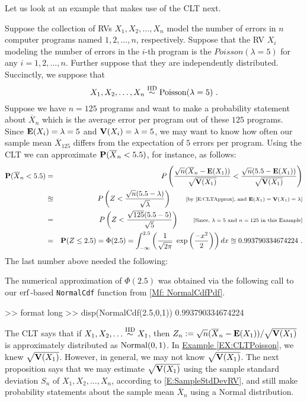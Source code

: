 Let us look at an example that makes use of the CLT next.
\begin{example}\label{EX:CLTPoisson}
Suppose the collection of RVs $X_1,X_2, \ldots, X_n$ model the number of errors in $n$ computer programs named $1,2,\ldots,n$, respectively.  Suppose that the RV $X_i$ modeling the number of errors in the $i$-th program is the $Poisson(\lambda=5)$ for any $i=1,2,\ldots,n$.  Further suppose that they are independently distributed.  Succinctly, we suppose that 
\[
X_1,X_2,\ldots,X_n \overset{{\rm IID}}{\sim} \mbox{{\rm Poisson}}(\lambda=5) \ . 
\]
Suppose we have $n=125$ programs and want to make a probability statement about $\overline{X}_n$ which is the average error per program out of these $125$ programs.  Since $\mathbf{E}(X_i) = \lambda=5$ and $\mathbf{V}(X_i)=\lambda=5$, we may want to know how often our sample mean $\overline{X}_{125}$ differs from the expectation of $5$ errors per program.  Using the CLT we can approximate $\mathbf{P}(\overline{X}_n < 5.5)$, for instance, as follows:
\begin{eqnarray}
\mathbf{P}(\overline{X}_n < 5.5) 
&=& P \left( \frac{\sqrt{n}(\overline{X}_n - \mathbf{E}(X_1))}{\sqrt{\mathbf{V}(X_1)}} < \frac{\sqrt{n}(5.5-\mathbf{E}(X_1))}{\sqrt{\mathbf{V}(X_1)}} \right) \notag \\
&\approxeq& P \left( Z < \frac{\sqrt{n}(5.5-\lambda)}{\sqrt{\lambda}} \right) \qquad \text{{\scriptsize [by \eqref{E:CLTApprox}, and $\mathbf{E}(X_1)=\mathbf{V}(X_1)=\lambda$]}} \notag \\
&=& P \left( Z < \frac{\sqrt{125}(5.5-5)}{\sqrt{5}} \right) \qquad \text{{\scriptsize [Since, $\lambda=5$ and $n=125$ in this Example]}} \notag \\
&=& \mathbf{P}(Z \leq 2.5) = \Phi(2.5) =  \int_{- \infty}^{2.5} \left( \frac{1}{\sqrt{2 \pi}} \ \exp \left( \frac{-x^2}{2} \right) \right) dx \approxeq 0.993790334674224 \ . \notag
\end{eqnarray}
The last number above needed the following:
\begin{labwork}
The numerical approximation of $\Phi(2.5)$ was obtained via the following call to our $\operatorname{erf}$-based {\tt NormalCdf} function from \ref*{Mf: NormalCdfPdf}.
\begin{VrbM}
>> format long
>> disp(NormalCdf(2.5,0,1))
   0.993790334674224
\end{VrbM}
\end{labwork}
\end{example}
The CLT says that if $X_1,X_2,\ldots \overset{{\rm IID}}{\sim} X_1$, then $Z_n := \sqrt{n}(\overline{X}_n-\mathbf{E}(X_1))/\sqrt{\mathbf{V}(X_1)}$ is approximately distributed as $\mbox{{\rm Normal}}(0,1)$.  In \hyperref[EX:CLTPoisson]{Example \ref*{EX:CLTPoisson}}, we knew $\sqrt{\mathbf{V}(X_1)}$.   However, in general, we may not know $\sqrt{\mathbf{V}(X_1)}$.  The next proposition says that we may estimate $\sqrt{\mathbf{V}(X_1)}$ using the sample standard deviation $S_n$ of $X_1,X_2,\ldots,X_n$, according to \eqref{E:SampleStdDevRV}, and still make probability statements about the sample mean $\overline{X}_n$ using a Normal distribution.
